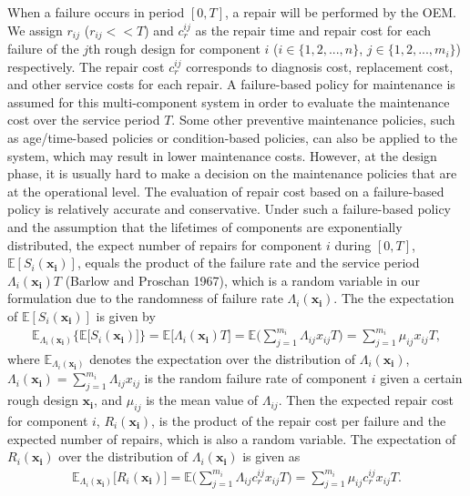 \documentclass[preprint,12pt]{elsarticle}
\begin{document}
When a failure occurs in period $[0, T]$, a repair will be performed by the OEM. We assign $r_{ij}$ ($r_{ij}<<T$) and $c_r^{ij}$ as the repair time and repair cost for each failure of the $j$th rough design for component $i$ ($i \in \{1,2,...,n\}$, $j \in \{1,2,...,m_i\}$) respectively. The repair cost $c_r^{ij}$ corresponds to diagnosis cost, replacement cost, and other service costs for each repair. A failure-based policy for maintenance is assumed for this multi-component system in order to evaluate the maintenance cost over the service period $T$. Some other preventive maintenance policies, such as age/time-based policies or condition-based policies, can also be applied to the system, which may result in lower maintenance costs. However, at the design phase, it is usually hard to make a decision on the maintenance policies that are at the operational level. The evaluation of repair cost based on a failure-based policy is relatively accurate and conservative. Under such a failure-based policy and the assumption that the lifetimes of components are exponentially distributed, the expect number of repairs for component $i$ during $[0,T]$, $\mathbb{E}[S_{i}(\boldsymbol{x_{i}})]$, equals the product of the failure rate and the service period $\Lambda_i(\boldsymbol{x_{i}}) T$ (Barlow and Proschan 1967), which is a random variable in our formulation due to the randomness of failure rate $\Lambda_{i}(\boldsymbol{x_{i}})$. The the expectation of $\mathbb{E}[S_{i}(\boldsymbol{x_{i}})]$ is given by
\begin {eqnarray}
\mathbb{E}_{\Lambda_{i}(\boldsymbol{x_{i}})} \bigg\{ \mathbb{E}\bigg[S_{i}(\boldsymbol{x_{i}})\bigg] \bigg\}=\mathbb{E}\bigg[\Lambda_{i}(\boldsymbol{x_{i}})T\bigg] =\mathbb{E}\bigg(\sum_{j=1}^{m_{i}}{\Lambda_{ij}x_{ij}}T\bigg)=\sum_{j=1}^{m_{i}}{\mu_{ij}x_{ij}}T,
\end {eqnarray}
where $\mathbb{E}_{\Lambda_{i}(\boldsymbol{x_{i}})}$ denotes the expectation over the distribution of $\Lambda_{i}(\boldsymbol{x_{i}})$, $\Lambda_{i}(\boldsymbol{x_{i}})=\sum_{j=1}^{m_{i}}{\Lambda_{ij}x_{ij}}$ is the random failure rate of component $i$ given a certain rough design $\boldsymbol{x_i}$, and $\mu_{ij}$ is the mean value of $\Lambda_{ij}$. Then the expected repair cost for component $i$, $R_{i}(\boldsymbol{x_{i}})$, is the product of the repair cost per failure and the expected number of repairs, which is also a random variable. The expectation of $R_{i}(\boldsymbol{x_{i}})$ over the distribution of $\Lambda_i(\boldsymbol{x_{i}})$ is given as
\begin {eqnarray}
\mathbb{E}_{\Lambda_{i}(\boldsymbol{x_{i}})} \bigg[ R_{i}(\boldsymbol{x_{i}}) \bigg]=\mathbb{E}\bigg(\sum_{j=1}^{m_{i}}{\Lambda_{ij}c_r^{ij}x_{ij}}T\bigg)= \sum_{j=1}^{m_{i}}{\mu_{ij}c_r^{ij}x_{ij}}T. \label{ERi}
\end {eqnarray}
\end{document}
